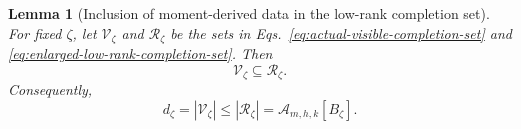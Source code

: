 \documentclass[11pt]{article}
\newcommand{\1}{\mathbf 1}
\theoremstyle{plain}
\newtheorem{lemma}[theorem]{Lemma}
\theoremstyle{definition}
\theoremstyle{remark}
\begin{document}
\begin{lemma}[Inclusion of moment-derived data in the low-rank completion set]
\label{lem:visible-to-ambient-completion}
For fixed $\zeta$, let $\mathcal V_{\zeta}$ and $\mathcal R_{\zeta}$ be the sets
in Eqs.~\eqref{eq:actual-visible-completion-set} and
\eqref{eq:enlarged-low-rank-completion-set}.  Then
\begin{equation}
 \mathcal V_{\zeta}\subseteq\mathcal R_{\zeta}.
 \label{eq:moment-derived-completion-inclusion}
\end{equation}
Consequently,
\begin{equation}
 d_{\zeta}=|\mathcal V_{\zeta}|
 \le |\mathcal R_{\zeta}|
 =\mathcal A_{m,h,k}[B_{\zeta}].
 \label{eq:realizable-versus-ambient-completions}
\end{equation}
\end{lemma}
\end{document}
